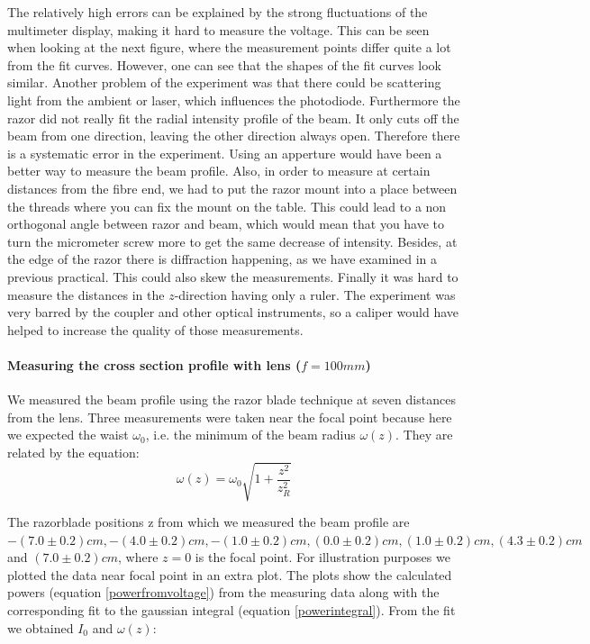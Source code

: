 \documentclass{article}
\begin{document}
The relatively high errors can be explained by the strong fluctuations of the multimeter display, making it hard to measure the voltage. This can be seen when looking at the next figure, where the measurement points differ quite a lot from the fit curves. However, one can see that the shapes of the fit curves look similar. Another problem of the experiment was that there could be scattering light from the ambient or laser, which influences the photodiode. Furthermore the razor did not really fit the radial intensity profile of the beam. It only cuts off the beam from one direction, leaving the other direction always open. Therefore there is a systematic error in the experiment. Using an apperture would have been a better way to measure the beam profile. Also, in order to measure at certain distances from the fibre end, we had to put the razor mount into a place between the threads where you can fix the mount on the table. This could lead to a non orthogonal angle between razor and beam, which would mean that you have to turn the micrometer screw more to get the same decrease of intensity. Besides, at the edge of the razor there is diffraction happening, as we have examined in a previous practical. This could also skew the measurements. Finally it was hard to measure the distances in the $z$-direction having only a ruler. The experiment was very barred by the coupler and other optical instruments, so a caliper would have helped to increase the quality of those measurements.

\paragraph{Measuring the cross section profile with lens ($f=100mm$)}

We measured the beam profile using the razor blade technique at seven distances from the lens. Three measurements were taken near the focal point because here we expected the waist $\omega_{0}$, i.e. the minimum of the beam radius $\omega (z)$. They are related by the equation:
\begin{equation}
\omega (z) = \omega_{0}\sqrt{1+\frac{z^2}{z_{R}^2}}
\label{omegaofz}
\end{equation}

The razorblade positions z from which we measured the beam profile are $-(7.0\pm 0.2)cm, -(4.0\pm 0.2)cm, -(1.0\pm 0.2)cm, (0.0\pm 0.2)cm, (1.0\pm 0.2)cm, (4.3\pm 0.2) cm$ and $(7.0\pm 0.2)cm$, where $z=0$ is the focal point. For illustration purposes we plotted the data near focal point in an extra plot. The plots show the calculated powers (equation \ref{powerfromvoltage}) from the measuring data along with the corresponding fit to the gaussian integral (equation \ref{powerintegral}). From the fit we obtained $I_{0}$ and $\omega(z)$:
\end{document}
